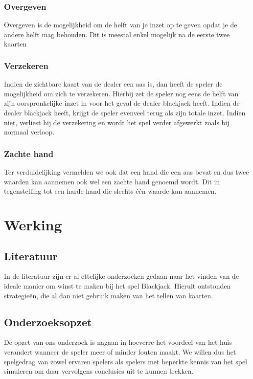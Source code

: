 \documentclass[conference]{IEEEtran}
\begin{document}
\subsubsection{Overgeven}
Overgeven is de mogelijkheid om de helft van je inzet op te geven opdat je de andere helft mag behouden. Dit is meestal enkel mogelijk na de eerste twee kaarten

\subsubsection{Verzekeren}
Indien de zichtbare kaart van de dealer een aas is, dan heeft de speler de mogelijkheid om zich te verzekeren. Hierbij zet de speler nog eens de helft van zijn oorspronkelijke inzet in voor het geval de dealer blackjack heeft. Indien de dealer blackjack heeft, krijgt de speler evenveel terug als zijn totale inzet. Indien niet, verliest hij de verzekering en wordt het spel verder afgewerkt zoals bij normaal verloop.

\subsubsection{Zachte hand}
Ter verduidelijking vermelden we ook dat een hand die een aas bevat en dus twee waarden kan aannemen ook wel een zachte hand genoemd wordt. Dit in tegenstelling tot een harde hand die slechts \'e\'en waarde kan aannemen.

\section{Werking}
\subsection{Literatuur}
In de literatuur zijn er al ettelijke onderzoeken gedaan naar het vinden van de ideale manier om winst te maken bij het spel Blackjack.
Hieruit ontstonden strategieën, die al dan niet gebruik maken van het tellen van kaarten. \cite{thorp1961favorable} \cite{baldwin1956optimum} \cite{fogel2004evolving}

\subsection{Onderzoeksopzet}
De opzet van ons onderzoek is nagaan in hoeverre het voordeel van het huis verandert wanneer de speler meer of minder fouten maakt. We willen dus het spelgedrag van zowel ervaren spelers als spelers met beperkte kennis van het spel simuleren om daar vervolgens conclusies uit te kunnen trekken.
\end{document}
